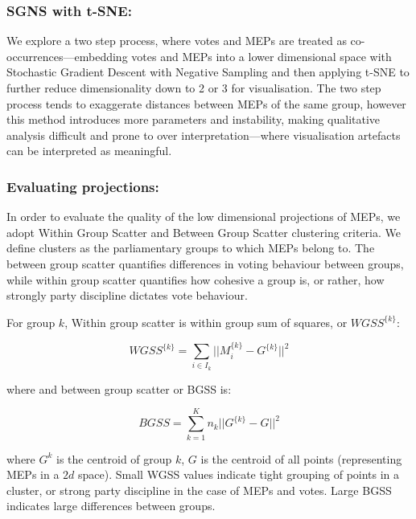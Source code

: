 \documentclass{llncs}
\newcommand{\clust}[2][k]{#2^{\{#1\}}}
\begin{document}
\subsubsection{SGNS with t-SNE:}
We explore a two step process, where votes and MEPs are treated as co-occurrences---embedding votes and MEPs into a lower dimensional space with Stochastic Gradient Descent with Negative Sampling\cite{levy2014neural} and then applying t-SNE to further reduce dimensionality down to 2 or 3 for visualisation.  The two step process tends to exaggerate distances between MEPs of the same group, however this method introduces more parameters and instability, making qualitative analysis difficult and prone to over interpretation---where visualisation artefacts can be interpreted as meaningful.

\subsubsection{Evaluating projections:}
In order to evaluate the quality of the low dimensional projections of MEPs, we adopt Within Group Scatter and Between Group Scatter clustering criteria. We define clusters as the parliamentary groups to which MEPs belong to. The between group scatter quantifies differences in voting behaviour between groups, while within group scatter quantifies how cohesive a group is, or rather, how strongly party discipline dictates vote behaviour\cite{Hix821}. 

For group $k$, Within group scatter is within group sum of squares, or $\clust{WGSS}$:

$$
\clust{WGSS} = \sum_{i\in I_{k}} ||\clust{M}_{i}-\clust{G}||^2
$$

where  and between group scatter or BGSS is:

$$
BGSS=\sum_{k=1}^K n_{k}||\clust{G}-G||^2
$$

where $G^k$ is the centroid of group $k$, $G$ is the centroid of all points (representing MEPs in a $2d$ space). Small WGSS values indicate tight grouping of points in a cluster, or strong party discipline in the case of MEPs and votes. Large BGSS indicates large differences between groups.


\end{document}
